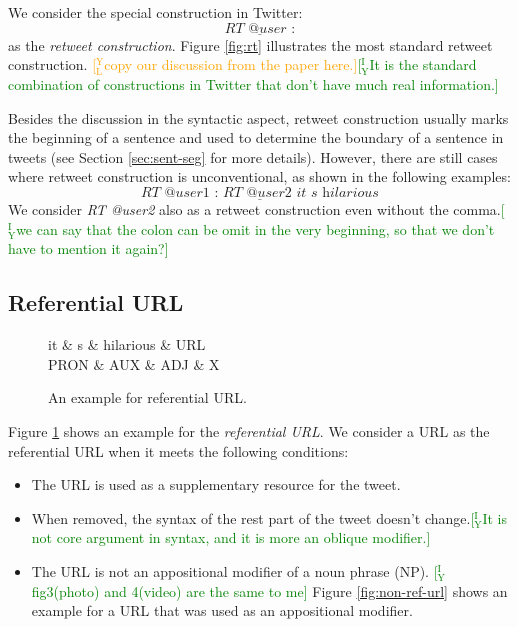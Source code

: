 \documentclass[11pt,a4paper]{article}
\newcommand{\yjcomment}[1]{\textcolor{orange}{[$_\mathrm{L}^\mathrm{Y}$#1]}}
\newcommand{\yicomment}[1]{\textcolor{green}{[$_\mathrm{Y}^\mathrm{I}$#1]}}
\begin{document}
We consider the special construction in Twitter: 
\[
\underline{\textit{RT @user :}}
\]
as the \textit{retweet construction}.
Figure \ref{fig:rt} illustrates the most standard retweet construction.
\yjcomment{copy our discussion from the paper here.}\yicomment{It is the standard combination of constructions in Twitter that don't have much real information.}

Besides the discussion in the syntactic aspect, 
retweet construction usually marks the beginning of a sentence and used to
determine the boundary of a sentence in tweets (see Section \ref{sec:sent-seg} for
more details).
However, there are still cases where retweet construction is unconventional, 
as shown in the following examples:
\[
\underline{\textit{RT @user1 : RT @user2 it s hilarious}}
\]
We consider \textit{RT @user2} also as a retweet construction even without the comma.\yicomment{we can say that the colon can be omit in the very beginning, so that we don't have to mention it again?}

\subsection{Referential URL}

\begin{figure}[t]
	\centering
	\small
	\begin{dependency}[edge slant=2, text only label, label style=above]
		\begin{deptext}
			it \& s \& hilarious \& URL \\
			PRON \& AUX \& ADJ \& X\\
		\end{deptext}
	\end{dependency}
	\caption{An example for referential URL.}\label{fig:ref-url}
\end{figure}

Figure \ref{fig:ref-url} shows an example for the \textit{referential URL}.
We consider a URL as the referential URL when it meets the following conditions:

\begin{itemize}
	\item The URL is used as a supplementary resource for the tweet.
	\item When removed, the syntax of the rest part of the tweet doesn't change.\yicomment{It is not core argument in syntax, and it is more an oblique modifier.}
	\item The URL is not an appositional modifier of a noun phrase (NP). \yicomment{fig3(photo) and 4(video) are the same to me}
	Figure \ref{fig:non-ref-url}
	shows an example for a URL that was used as an appositional modifier.
\end{itemize}
\end{document}
